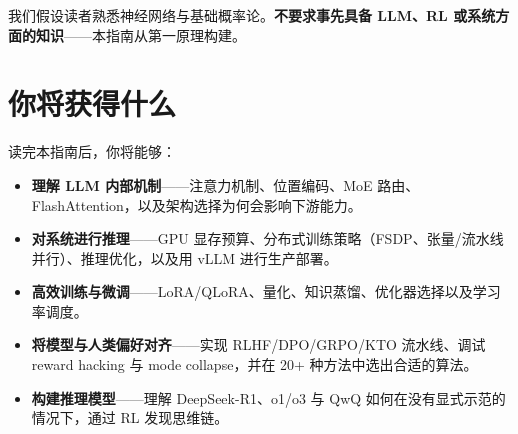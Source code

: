 \documentclass[11pt,a4paper,openany]{book}
\begin{document}
我们假设读者熟悉神经网络与基础概率论。\textbf{不要求事先具备 LLM、RL 或系统方面的知识}——本指南从第一原理构建。

\section*{你将获得什么}
\label{what-you-will-gain}

读完本指南后，你将能够：

\begin{itemize}
  \item \textbf{理解 LLM 内部机制}——注意力机制、位置编码、MoE 路由、FlashAttention，以及架构选择为何会影响下游能力。
  \item \textbf{对系统进行推理}——GPU 显存预算、分布式训练策略（FSDP、张量/流水线并行）、推理优化，以及用 vLLM 进行生产部署。
  \item \textbf{高效训练与微调}——LoRA/QLoRA、量化、知识蒸馏、优化器选择以及学习率调度。
  \item \textbf{将模型与人类偏好对齐}——实现 RLHF/DPO/GRPO/KTO 流水线、调试 reward hacking 与 mode collapse，并在 20+ 种方法中选出合适的算法。
  \item \textbf{构建推理模型}——理解 DeepSeek-R1、o1/o3 与 QwQ 如何在没有显式示范的情况下，通过 RL 发现思维链。

\end{itemize}
\end{document}
